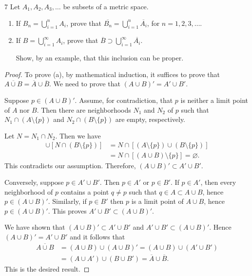 \begin{exercise}{7}
Let $A_1, A_2, A_3, \ldots$ be subsets of a metric space.
\begin{enumerate}
    \item[(a)] If $B_n = \bigcup_{i=1}^nA_i$, prove that $\overline{B_n} = \bigcup_{i=1}^n \overline{A_i}$, for $n= 1, 2, 3, \ldots$.
    \item[(b)] If $B= \bigcup_{i=1}^{\infty} A_i$, prove that $\overline{B} \supset \bigcup_{i=1}^{\infty}\overline{A_i}$.

Show, by an example, that this inclusion can be proper.
\end{enumerate}
\end{exercise}
\begin{proof}
To prove (a), by mathematical induction, it suffices to prove that $\overline{A \cup B} = \overline{A} \cup \overline{B}$. 
We need to prove that $(A \cup B)'=A' \cup B'$.

Suppose $p \in (A \cup B)'$. 
Assume, for contradiction, that $p$ is neither a limit point of $A$ nor $B$.
Then there are neighborhoods $N_1$ and $N_2$ of $p$ such that $N_1 \cap (A \setminus \{p\})$ and $N_2 \cap (B \setminus \{p\})$ are empty, respectively.

Let $N = N_1 \cap N_2$.
Then we have
\begin{align*}
    [N \cap (A \setminus \{p\})] \cup [N \cap (B \setminus \{p\})] &= N \cap [(A \setminus \{p\}) \cup (B \setminus \{p\})] \\
    &=N \cap [(A \cup B) \setminus \{p\}] = \varnothing.
\end{align*}
This contradicts our assumption. Therefore, $(A \cup B)' \subset A' \cup B'$.

Conversely, suppose $p \in A' \cup B'$.
Then $p \in A'$ or $p \in B'$.
If $p \in A'$, then every neighborhood of $p$ contains a point $q \neq p$ such that $q \in A \subset A \cup B$, hence $p \in (A \cup B)'$.
Similarly, if $p \in B'$ then $p$ is a limit point of $A \cup B$, hence $p \in (A \cup B)'$. 
This proves $A' \cup B' \subset (A \cup B)'$.

We have shown that $(A \cup B)' \subset A' \cup B'$ and $A' \cup B' \subset (A \cup B)'$. 
Hence $(A \cup B)'=A' \cup B'$ and it follows that 
\begin{align*}
    \overline{A \cup B}&=(A \cup B) \cup (A \cup B)'=(A \cup B) \cup (A' \cup B')\\
    &=(A \cup A') \cup (B \cup B') = \overline{A} \cup \overline{B}.
\end{align*}
This is the desired result.


\end{proof}
